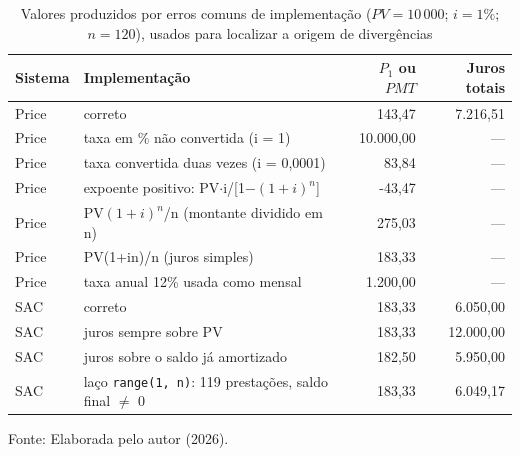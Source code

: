 \begin{table}[htb]
\centering
\small
\caption{Valores produzidos por erros comuns de implementação ($PV=10\,000$; $i=1\%$; $n=120$), usados para localizar a origem de divergências}
\label{tab:sintomas}
\begin{tabular}{llrr}
\hline
Sistema & Implementação & $P_1$ ou $PMT$ & Juros totais \\
\hline
Price & correto & 143{,}47 & 7.216{,}51 \\
Price & taxa em \% não convertida (i = 1) & 10.000{,}00 & --- \\
Price & taxa convertida duas vezes (i = 0,0001) & 83{,}84 & --- \\
Price & expoente positivo: PV$\cdot$i/[1$-$$(1+i)^n$] & -43{,}47 & --- \\
Price & PV$(1+i)^n$/n (montante dividido em n) & 275{,}03 & --- \\
Price & PV(1+in)/n (juros simples) & 183{,}33 & --- \\
Price & taxa anual 12\% usada como mensal & 1.200{,}00 & --- \\
SAC & correto & 183{,}33 & 6.050{,}00 \\
SAC & juros sempre sobre PV & 183{,}33 & 12.000{,}00 \\
SAC & juros sobre o saldo já amortizado & 182{,}50 & 5.950{,}00 \\
SAC & laço \texttt{range(1, n)}: 119 prestações, saldo final $\neq$ 0 & 183{,}33 & 6.049{,}17 \\
\hline
\end{tabular}
\par\vspace{0.1cm}
{\small Fonte: Elaborada pelo autor (2026).}
\end{table}
